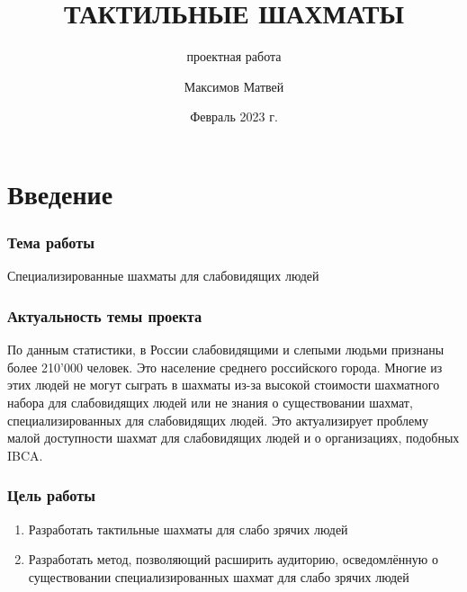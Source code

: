 \documentclass[]{beamer}
\title[тактильные шахматы]{ТАКТИЛЬНЫЕ ШАХМАТЫ}
\subtitle{проектная работа}
\author{Максимов Матвей}
\institute[МБОУ СОШ №73]{%
    Муниципальное бюджетное общеобразовательное учреждение\\
    <<Средняя общеобразовательная школа №73>>\\
    11 А класс}
\date{Февраль 2023 г.}
\begin{document}
\frame[label=Title]{\titlepage}

\section{Введение}

\begin{frame}
    \frametitle{Тема работы}
    \begin{center}
        Специализированные шахматы для слабовидящих людей
    \end{center}
\end{frame}

\begin{frame}
    \frametitle{Актуальность темы проекта}
    По данным статистики, в России слабовидящими и слепыми людьми признаны
    более 210'000 человек. Это население среднего российского города. Многие из
    этих людей не могут сыграть в шахматы из-за высокой стоимости шахматного
    набора для слабовидящих людей или не знания о существовании шахмат,
    специализированных для слабовидящих людей. Это актуализирует проблему малой
    доступности шахмат для слабовидящих людей и о организациях, подобных IBCA\@.
\end{frame}

\begin{frame}
    \frametitle{Цель работы}
    \begin{enumerate}
        \item Разработать тактильные шахматы для слабо зрячих людей
        \item Разработать метод, позволяющий расширить аудиторию, осведомлённую
            о существовании специализированных шахмат для слабо
            зрячих людей
    \end{enumerate}
\end{frame}
\end{document}
